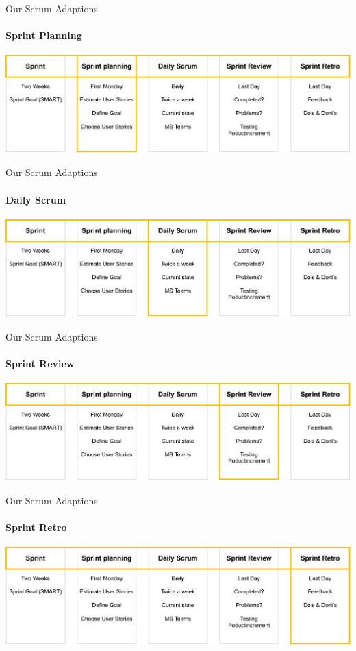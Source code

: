 \documentclass[
    ngerman,%
    authorontitle=true,
]{bfhbeamer}
\begin{document}
    \begin{frame}{Our Scrum Adaptions}
        \framesubtitle{Sprint Planning}
        \includegraphics[width=1\textwidth]{pictures/scrum_adaptions-Sprint_Planning}
    \end{frame}

    \begin{frame}{Our Scrum Adaptions}
        \framesubtitle{Daily Scrum}
        \includegraphics[width=1\textwidth]{pictures/scrum_adaptions-Daily_Scrum}
    \end{frame}

    \begin{frame}{Our Scrum Adaptions}
        \framesubtitle{Sprint Review}
        \includegraphics[width=1\textwidth]{pictures/scrum_adaptions-Sprint_Review}
    \end{frame}

    \begin{frame}{Our Scrum Adaptions}
        \framesubtitle{Sprint Retro}
        \includegraphics[width=1\textwidth]{pictures/scrum_adaptions-Sprint_Retro}
    \end{frame}
\end{document}
